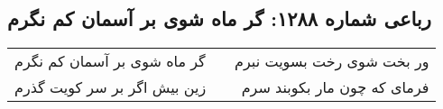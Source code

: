 \begin{center}
\section*{رباعی شماره ۱۲۸۸: گر ماه شوی بر آسمان کم نگرم}
\label{sec:1288}
\begin{longtable}{l p{0.5cm} r}
گر ماه شوی بر آسمان کم نگرم
&&
ور بخت شوی رخت بسویت نبرم
\\
زین بیش اگر بر سر کویت گذرم
&&
فرمای که چون مار بکوبند سرم
\\
\end{longtable}
\end{center}
